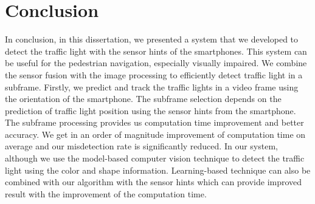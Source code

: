 \chapter{Conclusion}

In conclusion, in this dissertation, we presented a system that we developed to detect the traffic light with the sensor hints of the smartphones.
This system can be useful for the pedestrian navigation, especially visually impaired.
We combine the sensor fusion with the image processing to efficiently detect traffic light in a subframe.
Firstly, we predict and track the traffic lights in a video frame using the orientation of the smartphone.
The subframe selection depends on the prediction of traffic light position using the sensor hints from the smartphone.
The subframe processing provides us computation time improvement and better accuracy.
We get in an order of magnitude improvement of computation time on average and our misdetection rate is significantly reduced.
In our system, although we use the model-based computer vision technique to detect the traffic light using the color and shape information.
Learning-based technique can also be combined with our algorithm with the sensor hints which can provide improved result with the improvement of the computation time.



